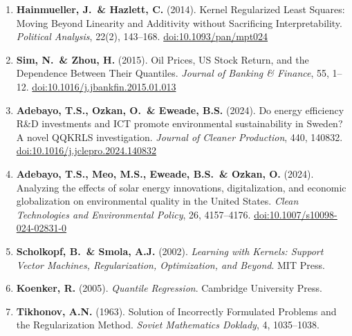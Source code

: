 \documentclass[12pt,a4paper]{article}
\theoremstyle{definition}
\begin{document}
\begin{enumerate}[leftmargin=2em]
\item \textbf{Hainmueller, J.\ \& Hazlett, C.} (2014). Kernel Regularized Least Squares: Moving Beyond Linearity and Additivity without Sacrificing Interpretability. \textit{Political Analysis}, 22(2), 143--168. \href{https://doi.org/10.1093/pan/mpt024}{doi:10.1093/pan/mpt024}

\item \textbf{Sim, N.\ \& Zhou, H.} (2015). Oil Prices, US Stock Return, and the Dependence Between Their Quantiles. \textit{Journal of Banking \& Finance}, 55, 1--12. \href{https://doi.org/10.1016/j.jbankfin.2015.01.013}{doi:10.1016/j.jbankfin.2015.01.013}

\item \textbf{Adebayo, T.S., Ozkan, O.\ \& Eweade, B.S.} (2024). Do energy efficiency R\&D investments and ICT promote environmental sustainability in Sweden? A novel QQKRLS investigation. \textit{Journal of Cleaner Production}, 440, 140832. \href{https://doi.org/10.1016/j.jclepro.2024.140832}{doi:10.1016/j.jclepro.2024.140832}

\item \textbf{Adebayo, T.S., Meo, M.S., Eweade, B.S.\ \& Ozkan, O.} (2024). Analyzing the effects of solar energy innovations, digitalization, and economic globalization on environmental quality in the United States. \textit{Clean Technologies and Environmental Policy}, 26, 4157--4176. \href{https://doi.org/10.1007/s10098-024-02831-0}{doi:10.1007/s10098-024-02831-0}

\item \textbf{Scholkopf, B.\ \& Smola, A.J.} (2002). \textit{Learning with Kernels: Support Vector Machines, Regularization, Optimization, and Beyond}. MIT Press.

\item \textbf{Koenker, R.} (2005). \textit{Quantile Regression}. Cambridge University Press.

\item \textbf{Tikhonov, A.N.} (1963). Solution of Incorrectly Formulated Problems and the Regularization Method. \textit{Soviet Mathematics Doklady}, 4, 1035--1038.
\end{enumerate}
\end{document}
